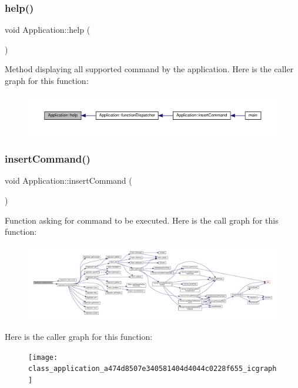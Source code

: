 \subsubsection{\texorpdfstring{help()}{help()}}
{\footnotesize\ttfamily void Application\+::help (\begin{DoxyParamCaption}{ }\end{DoxyParamCaption})\hspace{0.3cm}{\ttfamily [private]}}

Method displaying all supported command by the application. Here is the caller graph for this function\+:\nopagebreak
\begin{figure}[H]
\begin{center}
\leavevmode
\includegraphics[width=350pt]{class_application_a2c6518d7f121299d9be8c66d31997fbc_icgraph}
\end{center}
\end{figure}
\mbox{\label{class_application_a474d8507e340581404d4044c0228f655}} 
\subsubsection{\texorpdfstring{insert\+Command()}{insertCommand()}}
{\footnotesize\ttfamily void Application\+::insert\+Command (\begin{DoxyParamCaption}{ }\end{DoxyParamCaption})}

Function asking for command to be executed. Here is the call graph for this function\+:\nopagebreak
\begin{figure}[H]
\begin{center}
\leavevmode
\includegraphics[width=350pt]{class_application_a474d8507e340581404d4044c0228f655_cgraph}
\end{center}
\end{figure}
Here is the caller graph for this function\+:\nopagebreak
\begin{figure}[H]
\begin{center}
\leavevmode
\texttt{[image: class\_application\_a474d8507e340581404d4044c0228f655\_icgraph]}
\end{center}
\end{figure}
\mbox{\label{class_application_ab2f161414a4e2f16e28321c192051006}} 
